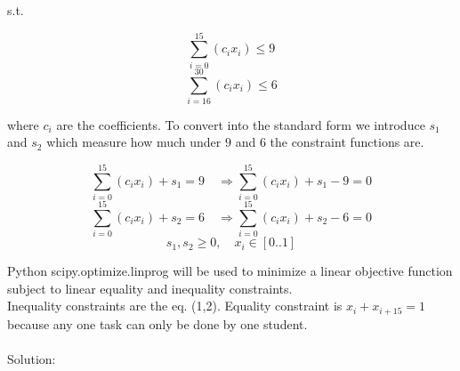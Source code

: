 \documentclass[12pt]{article}         %
\begin{document}
s.t.

\begin{equation}
 \sum_{i=0}^{15} ( c_i x_i) \le 9 
\end{equation}
\begin{equation}
\sum_{i=16}^{30} ( c_i x_i) \le 6 
\end{equation}

where $c_i$ are the coefficients. To convert into the standard form we introduce $s_1$ and $s_2$ which measure how much under $9$ and $6$ the constraint functions are.

$$
 \sum_{i=0}^{15} ( c_i x_i) + s_1 = 9 \quad\Rightarrow
 \sum_{i=0}^{15} ( c_i x_i) + s_1 - 9 = 0
$$
$$
 \sum_{i=0}^{15} ( c_i x_i) + s_2 = 6\quad\Rightarrow
 \sum_{i=0}^{15} ( c_i x_i) + s_2 - 6 = 0
$$
$$
s_1, s_2 \ge 0, \quad x_i \in [0 .. 1]
$$

Python scipy.optimize.linprog %
will be used to minimize a linear objective function subject to linear equality and inequality constraints. \\
Inequality constraints are the eq. (1,2). Equality constraint is $x_i + x_{i+15} = 1$ because any one task can only be done by one student.
\\ \\
Solution:
\end{document}
